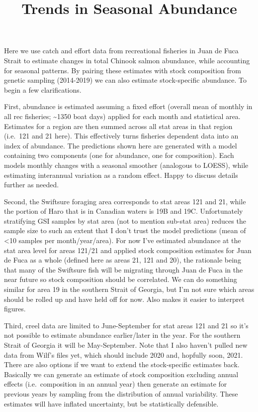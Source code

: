 \documentclass[
]{article}
\title{Trends in Seasonal Abundance}
\author{}
\date{\vspace{-2.5em}}
\begin{document}
\maketitle

Here we use catch and effort data from recreational fisheries in Juan de
Fuca Strait to estimate changes in total Chinook salmon abundance, while
accounting for seasonal patterns. By pairing these estimates with stock
composition from genetic sampling (2014-2019) we can also estimate
stock-specific abundance. To begin a few clarifications.

First, abundance is estimated assuming a fixed effort (overall mean of
monthly in all rec fisheries; \textasciitilde1350 boat days) applied for
each month and statistical area. Estimates for a region are then summed
across all stat areas in that region (i.e.~121 and 21 here). This
effectively turns fisheries dependent data into an index of abundance.
The predictions shown here are generated with a model containing two
components (one for abundance, one for composition). Each models monthly
changes with a seasonal smoother (analogous to LOESS), while estimating
interannual variation as a random effect. Happy to discuss details
further as needed.

Second, the Swiftsure foraging area corresponds to stat areas 121 and
21, while the portion of Haro that is in Canadian waters is 19B and 19C.
Unfortunately stratifying GSI samples by stat area (not to mention
sub-stat area) reduces the sample size to such an extent that I don't
trust the model predictions (mean of \textless10 samples per
month/year/area). For now I've estimated abundance at the stat area
level for areas 121/21 and applied stock composition estimates for Juan
de Fuca as a whole (defined here as areas 21, 121 and 20), the rationale
being that many of the Swiftsure fish will be migrating through Juan de
Fuca in the near future so stock composition should be correlated. We
can do something similar for area 19 in the southern Strait of Georgia,
but I'm not sure which areas should be rolled up and have held off for
now. Also makes it easier to interpret figures.

Third, creel data are limited to June-September for stat areas 121 and
21 so it's not possible to estimate abundance earlier/later in the year.
For the southern Strait of Georgia it will be May-September. Note that I
also haven't pulled new data from Wilf's files yet, which should include
2020 and, hopfully soon, 2021. There are also options if we want to
extend the stock-specific estimates back. Basically we can generate an
estimate of stock composition excluding annual effects (i.e.~composition
in an annual year) then generate an estimate for previous years by
sampling from the distribution of annual variability. These estimates
will have inflated uncertainty, but be statistically defensible.
\end{document}
